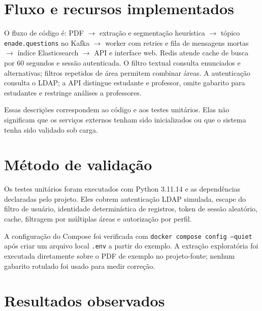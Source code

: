 \documentclass[12pt]{article}
\begin{document}
\section{Fluxo e recursos implementados}

O fluxo de código é: PDF $\rightarrow$ extração e segmentação heurística $\rightarrow$ tópico \texttt{enade.questions} no Kafka $\rightarrow$ worker com retries e fila de mensagens mortas $\rightarrow$ índice Elasticsearch $\rightarrow$ API e interface web. Redis atende cache de busca por 60 segundos e sessão autenticada. O filtro textual consulta enunciados e alternativas; filtros repetidos de área permitem combinar áreas. A autenticação consulta o LDAP; a API distingue estudante e professor, omite gabarito para estudantes e restringe análises a professores.

Essas descrições correspondem ao código e aos testes unitários. Elas não significam que os serviços externos tenham sido inicializados ou que o sistema tenha sido validado sob carga.

\section{Método de validação}

Os testes unitários foram executados com Python 3.11.14 e as dependências declaradas pelo projeto. Eles cobrem autenticação LDAP simulada, escape do filtro de usuário, identidade determinística de registros, token de sessão aleatório, cache, filtragem por múltiplas áreas e autorização por perfil.

A configuração do Compose foi verificada com \texttt{docker compose config --quiet} após criar um arquivo local \texttt{.env} a partir do exemplo. A extração exploratória foi executada diretamente sobre o PDF de exemplo no projeto-fonte; nenhum gabarito rotulado foi usado para medir correção.

\section{Resultados observados}
\end{document}
